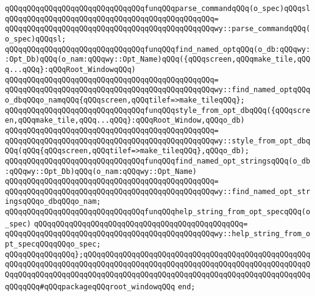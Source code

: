 \newline
\newline
\verb|qQQqqQQqqQQqqQQqqQQqqQQqqQQqqQQqfunqQQqparse_commandqQQq(o_spec)qQQqsl|\newline
\verb|qQQqqQQqqQQqqQQqqQQqqQQqqQQqqQQqqQQqqQQqqQQqqQQq=|\newline
\verb|qQQqqQQqqQQqqQQqqQQqqQQqqQQqqQQqqQQqqQQqqQQqqQQqwy::parse_commandqQQq(o_spec)qQQqsl;|\newline
\newline
\newline
\verb|qQQqqQQqqQQqqQQqqQQqqQQqqQQqqQQqfunqQQqfind_named_optqQQq(o_db:qQQqwy::Opt_Db)qQQq(o_nam:qQQqwy::Opt_Name)qQQq({qQQqscreen,qQQqmake_tile,qQQq...qQQq}:qQQqRoot_WindowqQQq)|\newline
\verb|qQQqqQQqqQQqqQQqqQQqqQQqqQQqqQQqqQQqqQQqqQQqqQQq=|\newline
\verb|qQQqqQQqqQQqqQQqqQQqqQQqqQQqqQQqqQQqqQQqqQQqqQQqwy::find_named_optqQQqo_dbqQQqo_namqQQq{qQQqscreen,qQQqtilef=>make_tileqQQq};|\newline
\newline
\newline
\verb|qQQqqQQqqQQqqQQqqQQqqQQqqQQqqQQqfunqQQqstyle_from_opt_dbqQQq({qQQqscreen,qQQqmake_tile,qQQq...qQQq}:qQQqRoot_Window,qQQqo_db)|\newline
\verb|qQQqqQQqqQQqqQQqqQQqqQQqqQQqqQQqqQQqqQQqqQQqqQQq=|\newline
\verb|qQQqqQQqqQQqqQQqqQQqqQQqqQQqqQQqqQQqqQQqqQQqqQQqwy::style_from_opt_dbqQQq(qQQq{qQQqscreen,qQQqtilef=>make_tileqQQq},qQQqo_db);|\newline
\newline
\newline
\verb|qQQqqQQqqQQqqQQqqQQqqQQqqQQqqQQqfunqQQqfind_named_opt_stringsqQQq(o_db:qQQqwy::Opt_Db)qQQq(o_nam:qQQqwy::Opt_Name)|\newline
\verb|qQQqqQQqqQQqqQQqqQQqqQQqqQQqqQQqqQQqqQQqqQQqqQQq=|\newline
\verb|qQQqqQQqqQQqqQQqqQQqqQQqqQQqqQQqqQQqqQQqqQQqqQQqwy::find_named_opt_stringsqQQqo_dbqQQqo_nam;|\newline
\newline
\newline
\verb|qQQqqQQqqQQqqQQqqQQqqQQqqQQqqQQqfunqQQqhelp_string_from_opt_specqQQq(o_spec)|\newline
\verb|qQQqqQQqqQQqqQQqqQQqqQQqqQQqqQQqqQQqqQQqqQQqqQQq=|\newline
\verb|qQQqqQQqqQQqqQQqqQQqqQQqqQQqqQQqqQQqqQQqqQQqqQQqwy::help_string_from_opt_specqQQqqQQqo_spec;|\newline
\newline
\verb|qQQqqQQqqQQqqQQq};qQQqqQQqqQQqqQQqqQQqqQQqqQQqqQQqqQQqqQQqqQQqqQQqqQQqqQQqqQQqqQQqqQQqqQQqqQQqqQQqqQQqqQQqqQQqqQQqqQQqqQQqqQQqqQQqqQQqqQQqqQQqqQQqqQQqqQQqqQQqqQQqqQQqqQQqqQQqqQQqqQQqqQQqqQQqqQQqqQQqqQQqqQQqqQQqqQQqqQQq#qQQqpackageqQQqroot_windowqQQq|\newline
\newline
\verb|end;|\newline
\newline


